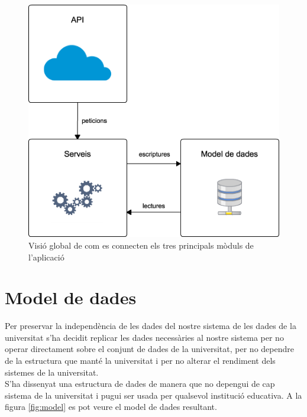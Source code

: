 \begin{figure}[h!]
    \includegraphics[scale=0.7]{img/estructura.png}
    \centering
    \caption{Visió global de com es connecten els tres principals mòduls de l'aplicació}
    \label{fig:estructura}
\end{figure}

\section{Model de dades}
 
Per preservar la independència de les dades del nostre sistema de les dades de la universitat s'ha decidit replicar les dades necessàries al nostre sistema per no operar directament sobre el conjunt de dades de la universitat, per no dependre de la estructura que manté la universitat i per no alterar el rendiment dels sistemes de la universitat.\\

S'ha dissenyat una estructura de dades de manera que no depengui de cap sistema de la universitat i pugui ser usada per qualsevol institució educativa. A la figura \ref{fig:model} es pot veure el model de dades resultant. \\

